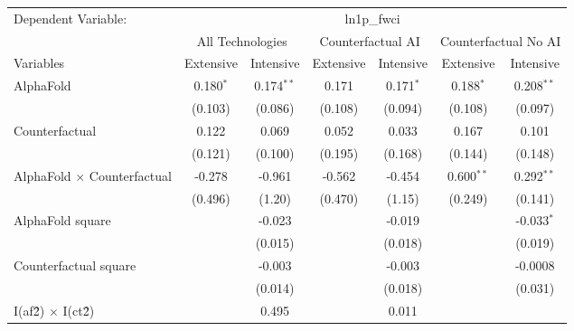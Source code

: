 \begingroup
\centering
\begin{tabular}{lcccccc}
   \tabularnewline \midrule \midrule
   Dependent Variable: & \multicolumn{6}{c}{ln1p\_fwci}\\
 & \multicolumn{2}{c}{All Technologies} & \multicolumn{2}{c}{Counterfactual AI} & \multicolumn{2}{c}{Counterfactual No AI} \\
\cmidrule(lr){1-1}\cmidrule(lr){2-3} \cmidrule(lr){4-5} \cmidrule(lr){6-7}
Variables & \multicolumn{1}{c}{Extensive} & \multicolumn{1}{c}{Intensive} & \multicolumn{1}{c}{Extensive} & \multicolumn{1}{c}{Intensive} & \multicolumn{1}{c}{Extensive} & \multicolumn{1}{c}{Intensive} \\
\cmidrule(lr){1-1}\cmidrule(lr){2-2} \cmidrule(lr){3-3} \cmidrule(lr){4-4} \cmidrule(lr){5-5} \cmidrule(lr){6-6} \cmidrule(lr){7-7}
   AlphaFold                          & 0.180$^{*}$ & 0.174$^{**}$ & 0.171   & 0.171$^{*}$ & 0.188$^{*}$  & 0.208$^{**}$\\   
                                      & (0.103)     & (0.086)      & (0.108) & (0.094)     & (0.108)      & (0.097)\\   
   Counterfactual                     & 0.122       & 0.069        & 0.052   & 0.033       & 0.167        & 0.101\\   
                                      & (0.121)     & (0.100)      & (0.195) & (0.168)     & (0.144)      & (0.148)\\   
   AlphaFold $\times$ Counterfactual  & -0.278      & -0.961       & -0.562  & -0.454      & 0.600$^{**}$ & 0.292$^{**}$\\   
                                      & (0.496)     & (1.20)       & (0.470) & (1.15)      & (0.249)      & (0.141)\\   
   AlphaFold square                   &             & -0.023       &         & -0.019      &              & -0.033$^{*}$\\   
                                      &             & (0.015)      &         & (0.018)     &              & (0.019)\\   
   Counterfactual square              &             & -0.003       &         & -0.003      &              & -0.0008\\   
                                      &             & (0.014)      &         & (0.018)     &              & (0.031)\\   
   I(af\^2) $\times$ I(ct\^2)         &             & 0.495        &         & 0.011       &              &   \\   

\end{tabular}
